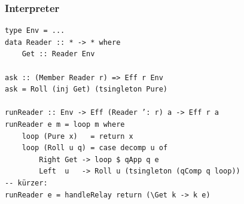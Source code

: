 \documentclass[12pt,compress,ngerman,utf8,t]{beamer}
\begin{document}
\begin{frame}[fragile]\frametitle{Interpreter}
  \begin{verbatim}
type Env = ...
data Reader :: * -> * where
    Get :: Reader Env

ask :: (Member Reader r) => Eff r Env
ask = Roll (inj Get) (tsingleton Pure)

runReader :: Env -> Eff (Reader ’: r) a -> Eff r a
runReader e m = loop m where
    loop (Pure x)   = return x
    loop (Roll u q) = case decomp u of
        Right Get -> loop $ qApp q e
        Left  u   -> Roll u (tsingleton (qComp q loop))
-- kürzer:
runReader e = handleRelay return (\Get k -> k e)
  \end{verbatim}
\end{frame}

\end{document}
